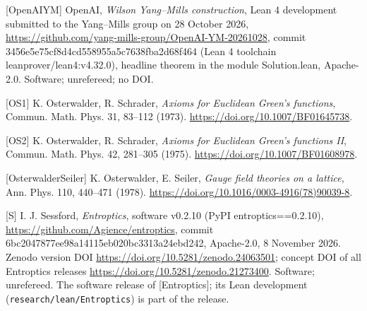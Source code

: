 \documentclass[10pt,letterpaper,twocolumn]{article}
\begin{document}
{[}OpenAIYM{]} OpenAI, \emph{Wilson Yang--Mills construction}, Lean 4 development submitted to the Yang--Mills group on 28 October 2026, \href{https://github.com/yang-mills-group/OpenAI-YM-20261028}{https:\allowbreak{}/\allowbreak{}/\allowbreak{}github.\allowbreak{}com/\allowbreak{}yang-\allowbreak{}mills-\allowbreak{}group/\allowbreak{}OpenAI-\allowbreak{}YM-\allowbreak{}20261028}, commit 3456e5e7\allowbreak{}5cf8d4cd\allowbreak{}558955a5\allowbreak{}c7638fba\allowbreak{}2d68f464 (Lean 4 toolchain leanprov\allowbreak{}er/\allowbreak{}lean4:\allowbreak{}v4.\allowbreak{}32.\allowbreak{}0)\allowbreak{}, headline theorem in the module Solution.lean, Apache-2.0. Software; unrefereed; no DOI.

{[}OS1{]} K. Osterwalder, R. Schrader, \emph{Axioms for Euclidean Green's functions}, Commun. Math. Phys. 31, 83--112 (1973). \href{https://doi.org/10.1007/BF01645738}{https:\allowbreak{}/\allowbreak{}/\allowbreak{}doi.\allowbreak{}org/\allowbreak{}10.\allowbreak{}1007/\allowbreak{}BF016457\allowbreak{}38}.

{[}OS2{]} K. Osterwalder, R. Schrader, \emph{Axioms for Euclidean Green's functions II}, Commun. Math. Phys. 42, 281--305 (1975). \href{https://doi.org/10.1007/BF01608978}{https:\allowbreak{}/\allowbreak{}/\allowbreak{}doi.\allowbreak{}org/\allowbreak{}10.\allowbreak{}1007/\allowbreak{}BF016089\allowbreak{}78}.

{[}OsterwalderSeiler{]} K. Osterwalder, E. Seiler, \emph{Gauge field theories on a lattice}, Ann. Phys. 110, 440--471 (1978). \href{https://doi.org/10.1016/0003-4916(78)90039-8}{https:\allowbreak{}/\allowbreak{}/\allowbreak{}doi.\allowbreak{}org/\allowbreak{}10.\allowbreak{}1016/\allowbreak{}0003-\allowbreak{}4916(\allowbreak{}78)\allowbreak{}90039-\allowbreak{}8}.

{[}S{]} I. J. Sessford, \emph{Entroptics}, software v0.2.10 (PyPI entroptics==0.2.10), \href{https://github.com/Agience/entroptics}{https:\allowbreak{}/\allowbreak{}/\allowbreak{}github.\allowbreak{}com/\allowbreak{}Agience/\allowbreak{}entropti\allowbreak{}cs}, commit 6bc20478\allowbreak{}77ee98a1\allowbreak{}4115eb02\allowbreak{}0bc3313a\allowbreak{}24ebd242\allowbreak{}, Apache-2.0, 8 November 2026. Zenodo version DOI \href{https://doi.org/10.5281/zenodo.24063501}{https:\allowbreak{}/\allowbreak{}/\allowbreak{}doi.\allowbreak{}org/\allowbreak{}10.\allowbreak{}5281/\allowbreak{}zenodo.\allowbreak{}24063501}; concept DOI of all Entroptics releases \href{https://doi.org/10.5281/zenodo.21273400}{https:\allowbreak{}/\allowbreak{}/\allowbreak{}doi.\allowbreak{}org/\allowbreak{}10.\allowbreak{}5281/\allowbreak{}zenodo.\allowbreak{}21273400}. Software; unrefereed. The software release of {[}Entroptics{]}; its Lean development (\texttt{research/\allowbreak{}lean/\allowbreak{}Entroptics}) is part of the release.
\end{document}
